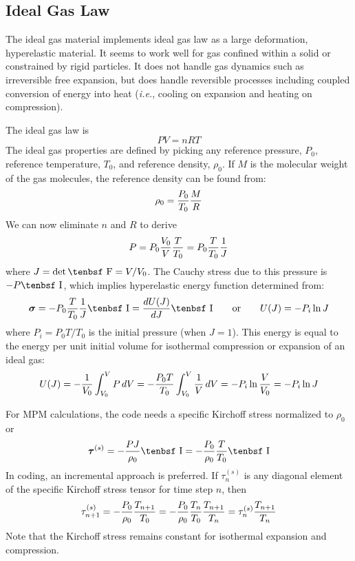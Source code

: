 \documentclass[11pt]{article}
\renewcommand{\vec}[1]{\boldsymbol{#1}}
\def\F{\hbox{\tenbsf F}}
\def\I{\hbox{\tenbsf I}}
\begin{document}
\subsection{Ideal Gas Law}

The ideal gas material implements ideal gas law as a large deformation, hyperelastic material. It seems to work well for gas confined within a solid or constrained by rigid particles. It does not handle gas dynamics such as irreversible free expansion, but does handle reversible processes including coupled conversion of energy into heat ({\em i.e.}, cooling on expansion and heating on compression).

The ideal gas law is
\begin{equation}
    PV = nRT
\end{equation}
The ideal gas properties are defined by picking any reference pressure, $P_0$, reference temperature, $T_0$, and reference density, $\rho_0$. If $M$ is the molecular weight of the gas molecules, the reference density can be found from:
\begin{equation}
    \rho_0 = {P_0\over T_0} {M\over R}
\end{equation}
We can now eliminate $n$ and $R$ to derive
\begin{equation}
    P = P_0{V_0\over V}{T\over T_0} = P_0 {T\over T_0} {1\over J} \label{geniglaw}
\end{equation}
where $J = \det \F = V/V_0$. The Cauchy stress due to this pressure is $-P\I$, which implies hyperelastic energy function determined from:
\begin{equation}
    \vec\sigma = - P_0 {T\over T_0} {1\over J}\I = {dU(J)\over dJ}\I
        \qquad{\rm or}\qquad
         U(J) = - P_i \ln J
\end{equation}
where $P_i = P_0T/T_0$ is the initial pressure (when $J=1$). This energy is equal to the energy per unit initial volume for isothermal compression or expansion of an ideal gas:
\begin{equation}
    U(J) = - {1\over V_0} \int_{V_0}^V P\thinspace dV = - {P_0T\over T_0} \int_{V_0}^V {1\over V}\thinspace dV = - P_i \ln {V\over V_0} = - P_i \ln J
\end{equation}

For MPM calculations, the code needs a specific Kirchoff stress normalized to $\rho_0$ or
\begin{equation}
    \vec\tau^{(s)} = -{PJ\over \rho_0}\I  = - {P_0\over \rho_0} {T\over T_0}\I
\end{equation}
In coding, an incremental approach is preferred. 
If $\tau_n^{(s)}$ is any diagonal element of the specific Kirchoff stress tensor for time step $n$, then
\begin{equation}
   \tau_{n+1}^{(s)} = - {P_0\over \rho_0} {T_{n+1}\over T_0}  = - {P_0\over \rho_0} {T_n\over T_0} {T_{n+1}\over T_n}
       = \tau_n^{(s)} {T_{n+1}\over T_n}
\end{equation}
Note that the Kirchoff stress remains constant for isothermal expansion and compression.
\end{document}
